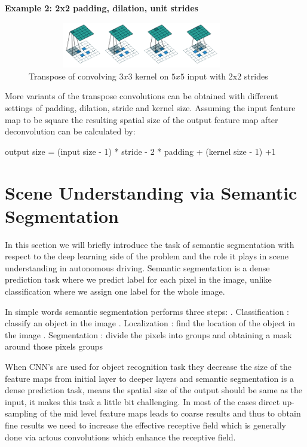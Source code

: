     \textbf{Example 2: 2x2 padding, dilation, unit strides}
     \begin{figure}[h]
    \centering
    \includegraphics[width=10cm, height =2cm]{images/transpose_case2.png}
    \caption{Transpose of convolving $3x3$ kernel on $5x5$ input with 2x2 strides \cite{https://doi.org/10.48550/arxiv.1603.07285}}
    \end{figure}
    
    More variants of the transpose convolutions can be obtained with different settings of padding, dilation, stride and kernel size. Assuming the input feature map to be square the resulting spatial size of the output feature map after deconvolution can be calculated by:
    
       \begin{center}\newline
       output size = (input size - 1) * stride - 2 * padding + (kernel size - 1) +1
   \end{center}
    

    \section{Scene Understanding via Semantic Segmentation}
    In this section we will briefly introduce the task of semantic segmentation with respect to the deep learning side of the problem and the role it plays in scene understanding in autonomous driving. Semantic segmentation is a dense prediction task where we predict label for each pixel in the image, unlike classification where we assign one label for the whole image.
    
    In simple words semantic segmentation performs three steps: . Classification : classify an object in the image  . Localization : find the location of the object in the image . Segmentation : divide the pixels into groups and obtaining a mask around those pixels groups 
    
     When CNN's are used for object recognition task they decrease the size of the feature maps from initial layer to deeper layers and semantic segmentation is a dense prediction task, means the spatial size of the output should be same as the input, it makes this task a little bit challenging. In most of the cases direct up-sampling of the mid level feature maps leads to coarse results and thus to obtain fine results we need to increase the effective receptive field which is generally done via artous convolutions which enhance the receptive field. 
     
